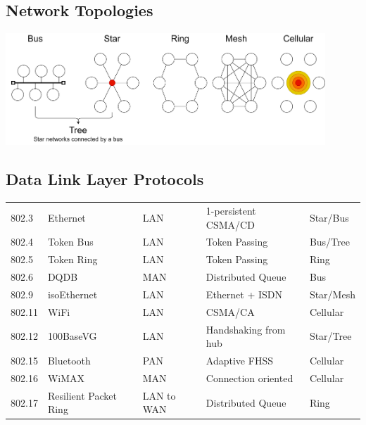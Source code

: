 \subsection{Network Topologies}
\begin{center}\includegraphics[width=0.9\textwidth]{data_link_layer/images/network topologies}\end{center}

\subsection{Data Link Layer Protocols}
\begin{center}
    \begin{tabular}{l l l l l}
        802.3  & Ethernet              & LAN        & 1-persistent CSMA/CD & Star/Bus  \\
        802.4  & Token Bus             & LAN        & Token Passing        & Bus/Tree  \\
        802.5  & Token Ring            & LAN        & Token Passing        & Ring      \\
        802.6  & DQDB                  & MAN        & Distributed Queue    & Bus       \\
        802.9  & isoEthernet           & LAN        & Ethernet + ISDN      & Star/Mesh \\
        802.11 & WiFi                  & LAN        & CSMA/CA              & Cellular  \\
        802.12 & 100BaseVG             & LAN        & Handshaking from hub & Star/Tree \\
        802.15 & Bluetooth             & PAN        & Adaptive FHSS        & Cellular  \\
        802.16 & WiMAX                 & MAN        & Connection oriented  & Cellular  \\
        802.17 & Resilient Packet Ring & LAN to WAN & Distributed Queue    & Ring      \\
    \end{tabular}
\end{center}

